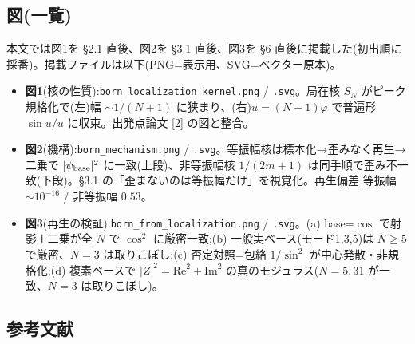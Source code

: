 \documentclass[
]{ltjsarticle}
\providecommand{\tightlist}{%
  \setlength{\itemsep}{0pt}\setlength{\parskip}{0pt}}
\begin{document}
\subsection{図(一覧)}\label{ux56f3ux4e00ux89a7}

本文では図1を §2.1 直後、図2を §3.1 直後、図3を §6
直後に掲載した(初出順に採番)。掲載ファイルは以下(PNG=表示用、SVG=ベクター原本)。

\begin{itemize}
\tightlist
\item
  \textbf{図1}(核の性質):\texttt{born\_localization\_kernel.png} /
  \texttt{.svg}。局在核 \(S_N\) がピーク規格化で(左)幅 \(\sim1/(N+1)\)
  に狭まり、(右)\(u=(N+1)\varphi\) で普遍形 \(\sin u/u\)
  に収束。出発点論文 {[}2{]} の図と整合。
\item
  \textbf{図2}(機構):\texttt{born\_mechanism.png} /
  \texttt{.svg}。等振幅核は標本化→歪みなく再生→二乗で
  \(|\psi_{\rm base}|^2\) に一致(上段)、非等振幅核 \(1/(2m+1)\)
  は同手順で歪み不一致(下段)。§3.1
  の「歪まないのは等振幅だけ」を視覚化。再生偏差 等振幅 \(\sim10^{-16}\)
  / 非等振幅 \(0.53\)。
\item
  \textbf{図3}(再生の検証):\texttt{born\_from\_localization.png} /
  \texttt{.svg}。(a) base=\(\cos\) で射影＋二乗が全 \(N\) で \(\cos^2\)
  に厳密一致;(b) 一般実ベース(モード1,3,5)は \(N\ge5\) で厳密、\(N=3\)
  は取りこぼし;(c) 否定対照=包絡 \(1/\sin^2\) が中心発散・非規格化;(d)
  複素ベースで \(|Z|^2=\mathrm{Re}^2+\mathrm{Im}^2\)
  の真のモジュラス(\(N=5,31\) が一致、\(N=3\) は取りこぼし)。
\end{itemize}

\subsection{参考文献}\label{ux53c2ux8003ux6587ux732e}
\end{document}
